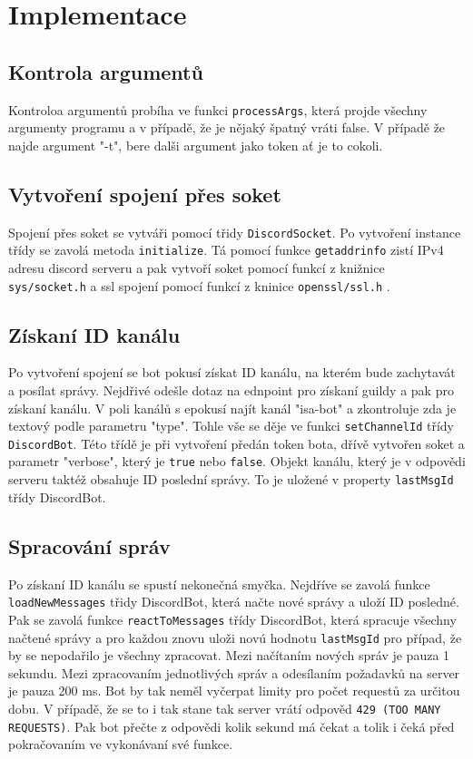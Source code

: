 \documentclass[a4paper,11pt]{article}
\begin{document}
\section{Implementace}
\subsection{Kontrola argumentů}
Kontroloa argumentů probíha ve funkci \texttt{processArgs}, která projde všechny argumenty programu a v případě, že je nějaký špatný vráti false. V případě že najde argument "-t", bere dalši argument jako token ať je to cokoli.

\subsection{Vytvoření spojení přes soket}
Spojení přes soket se vytváři pomocí třidy \texttt{DiscordSocket}. Po vytvoření instance třídy se zavolá metoda \texttt{initialize}. Tá pomocí funkce \texttt{getaddrinfo} zistí IPv4 adresu discord serveru a pak vytvoří soket pomocí funkcí z knižnice \texttt{sys/socket.h} \cite{socketc} a ssl spojení pomocí funkcí z kninice \texttt{openssl/ssl.h} \cite{ssldocs}.

\subsection{Získaní ID kanálu}
Po vytvoření spojení se bot pokusí získat ID kanálu, na kterém bude zachytavát a posílat správy. Nejdřivé odešle dotaz na ednpoint pro získaní guildy a pak pro získaní kanálu. V poli kanálů s epokusí najít kanál "isa-bot" a zkontroluje zda je textový podle parametru "type". Tohle vše se děje ve funkci \texttt{setChannelId} třídy \texttt{DiscordBot}.
Této třídě je při vytvoření předán token bota, dřívě vytvořen soket a parametr "verbose", který je \texttt{true} nebo \texttt{false}. Objekt kanálu, který je v odpovědi serveru taktéž obsahuje ID poslední správy. To je uložené v property \texttt{lastMsgId} třídy DiscordBot.

\subsection{Spracování správ}
Po získaní ID kanálu se spustí nekonečná smyčka. Nejdříve se zavolá funkce \texttt{loadNewMessages} třidy DiscordBot, která načte nové správy a uloží ID posledné. Pak se zavolá funkce \texttt{reactToMessages} třídy DiscordBot, která spracuje všechny načtené správy a pro každou znovu uloži novú hodnotu \texttt{lastMsgId} pro případ, že by se nepodařilo je všechny zpracovat. Mezi načítaním nových správ je pauza 1 sekundu. Mezi zpracovaním jednotlivých správ a odesílaním požadavků na server je pauza 200 ms. Bot by tak neměl vyčerpat limity pro počet requestů za určitou dobu. V případě, že se to i tak stane tak server vrátí odpověd \texttt{429 (TOO MANY REQUESTS)}. Pak bot přečte z odpovědi kolik sekund má čekat a tolik i čeká před pokračovaním ve vykonávaní své funkce.
\end{document}
